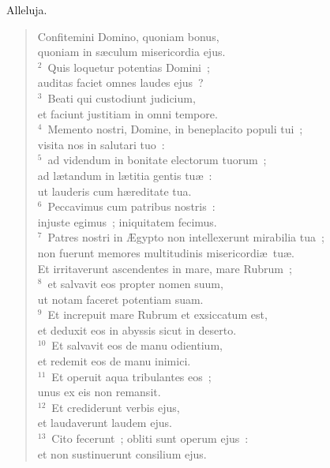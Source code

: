 \bchapter
\lettrine[lines=3,image=true,loversize=0.05,lraise=-0.03]{A}{}lleluja. \begin{flushleft}\begin{verse}\vspace{6pt}Confitemini Domino, quoniam bonus,\\ quoniam in s\ae culum misericordia ejus.\\
${}^{2}$~Quis loquetur potentias Domini~;\\ auditas faciet omnes laudes ejus~?\\
${}^{3}$~Beati qui custodiunt judicium,\\ et faciunt justitiam in omni tempore.\\
${}^{4}$~Memento nostri, Domine, in beneplacito populi tui~;\\ visita nos in salutari tuo~:\\
${}^{5}$~ad videndum in bonitate electorum tuorum~;\\ ad l\ae tandum in l\ae titia gentis tu\ae~:\\ ut lauderis cum h\ae reditate tua.\\
${}^{6}$~Peccavimus cum patribus nostris~:\\ injuste egimus~; iniquitatem fecimus.\\
${}^{7}$~Patres nostri in \AE gypto non intellexerunt mirabilia tua~;\\ non fuerunt memores multitudinis misericordi\ae\ tu\ae .\\ Et irritaverunt ascendentes in mare, mare Rubrum~;\\
${}^{8}$~et salvavit eos propter nomen suum,\\ ut notam faceret potentiam suam.\\
${}^{9}$~Et increpuit mare Rubrum et exsiccatum est,\\ et deduxit eos in abyssis sicut in deserto.\\
${}^{10}$~Et salvavit eos de manu odientium,\\ et redemit eos de manu inimici.\\
${}^{11}$~Et operuit aqua tribulantes eos~;\\ unus ex eis non remansit.\\
${}^{12}$~Et crediderunt verbis ejus,\\ et laudaverunt laudem ejus.\\
${}^{13}$~Cito fecerunt~; obliti sunt operum ejus~:\\ et non sustinuerunt consilium ejus.\\

\end{verse}
\end{flushleft}
